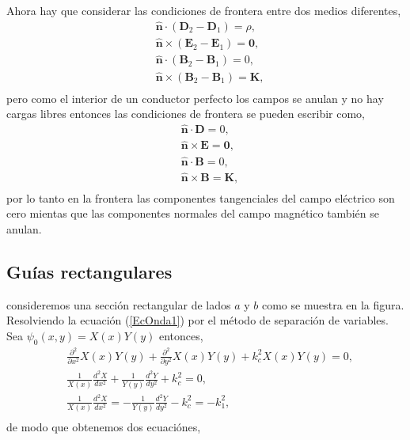 \documentclass[11pt,fleqn]{book} %
\begin{document}
 Ahora hay que considerar las condiciones de frontera entre dos medios diferentes,
 \begin{equation*}
  \begin{split}
  &\hat{\textbf{n}}\cdot(\textbf{D}_2-\textbf{D}_1)=\rho,\\
   &\hat{\textbf{n}}\times(\textbf{E}_2-\textbf{E}_1)=\textbf{0},\\
 &\hat{\textbf{n}}\cdot(\textbf{B}_2-\textbf{B}_1)=0,\\
  &\hat{\textbf{n}}\times(\textbf{B}_2-\textbf{B}_1)=\textbf{K},\\
  \end{split}
  \end{equation*}
  pero como el interior de un conductor perfecto los campos se anulan y no hay cargas libres entonces las condiciones de frontera se pueden escribir como,
 \begin{equation*}
  \begin{split}
  &\hat{\textbf{n}}\cdot\textbf{D}=0,\\
   &\hat{\textbf{n}}\times\textbf{E}=\textbf{0},\\
 &\hat{\textbf{n}}\cdot\textbf{B}=0,\\
  &\hat{\textbf{n}}\times\textbf{B}=\textbf{K},\\
  \end{split}
  \end{equation*}
  por lo tanto en la frontera las componentes tangenciales del campo el\'ectrico son cero mientas que las componentes normales del campo magn\'etico tambi\'en se anulan.

\subsection{Gu\'ias rectangulares}

consideremos una secci\'on rectangular de lados $a$ y $b$ como se muestra en la figura. Resolviendo la ecuaci\'on (\ref{EcOnda1}) por el m\'etodo de separaci\'on de variables. Sea $\psi_0(x,y)=X(x)Y(y)$ entonces,
 \begin{equation*}
  \begin{split}
& \frac{\partial^2}{\partial x^2}X(x)Y(y)+\frac{\partial^2}{\partial y^2}X(x)Y(y)+k_c^2X(x)Y(y)=0,\\
& \frac{1}{X(x)}\frac{d^2X}{dx^2}+\frac{1}{Y(y)}\frac{d^2Y}{dy^2}+k_c^2=0,\\
& \frac{1}{X(x)}\frac{d^2X}{dx^2}=-\frac{1}{Y(y)}\frac{d^2Y}{dy^2}-k_c^2=-k_1^2,\\
  \end{split}
  \end{equation*}
  de modo que obtenemos dos ecuaci\'ones,
\end{document}
